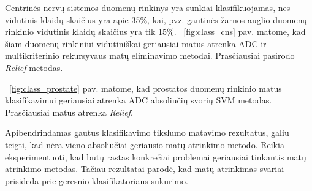 Centrinės nervų sistemos duomenų rinkinys yra sunkiai klasifikuojamas, nes vidutinis klaidų skaičius yra apie 35\%, kai, pvz. gautinės žarnos auglio duomenų rinkinio vidutinis klaidų skaičius yra tik 15\%. ~\ref{fig:class_cns} pav. matome, kad šiam duomenų rinkiniui vidutiniškai geriausiai matus atrenka ADC ir multikriterinio rekursyvaus matų eliminavimo metodai. Prasčiausiai pasirodo \textit{Relief} metodas.

~\ref{fig:class_prostate} pav. matome, kad prostatos duomenų rinkinio matus klasifikavimui geriausiai atrenka ADC absoliučių svorių SVM metodas. Prasčiausiai matus atrenka \textit{Relief}.

Apibendrindamas gautus klasifikavimo tikslumo matavimo rezultatus, galiu teigti, kad nėra vieno absoliučiai geriausio matų atrinkimo metodo. Reikia eksperimentuoti, kad būtų rastas konkrečiai problemai geriausiai tinkantis matų atrinkimo metodas. Tačiau rezultatai parodė, kad matų atrinkimas svariai prisideda prie geresnio klasifikatoriaus sukūrimo.

